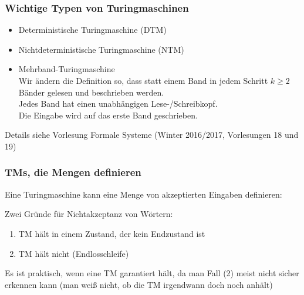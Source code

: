 \documentclass[onlymath]{beamer}
\begin{document}
\begin{frame}\frametitle{Wichtige Typen von Turingmaschinen}

\begin{itemize}
\item \alert{Deterministische Turingmaschine} (DTM)
\item \alert{Nichtdeterministische Turingmaschine} (NTM)
\item \alert{Mehrband-Turingmaschine}\\
	Wir ändern die Definition so, dass statt einem Band in jedem Schritt $k\geq 2$ Bänder gelesen
	und beschrieben werden.\\
	Jedes Band hat einen unabhängigen Lese-/Schreibkopf.\\
	Die Eingabe wird auf das erste Band geschrieben.
\end{itemize}


Details siehe Vorlesung Formale Systeme (Winter 2016/2017, Vorlesungen 18 und 19)

\end{frame}


\begin{frame}\frametitle{TMs, die Mengen definieren}

Eine Turingmaschine kann eine Menge von akzeptierten Eingaben definieren:

\pause

Zwei Gründe für Nichtakzeptanz von Wörtern:
\begin{enumerate}[(1)]
\item TM hält in einem Zustand, der kein Endzustand ist
\item TM hält nicht (Endlosschleife)
\end{enumerate}
Es ist praktisch, wenn eine TM garantiert hält, da man Fall (2) meist nicht sicher erkennen kann (man weiß nicht, ob die TM irgendwann doch noch anhält)


\end{frame}
\end{document}
